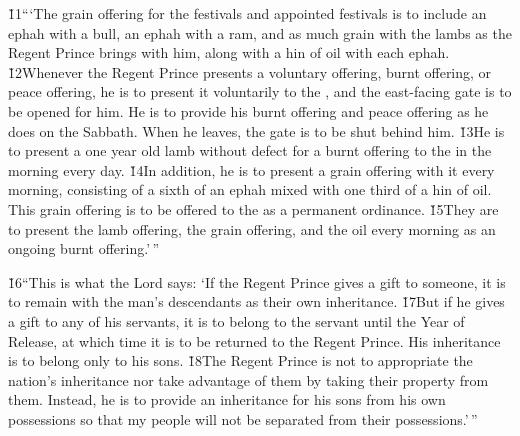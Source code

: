 \v{11}```The grain offering for the festivals and appointed festivals is to include an ephah with a bull, an ephah with a ram, and as much grain with the lambs as the Regent Prince brings with him, along with a hin of oil with each ephah. \v{12}Whenever the Regent Prince presents a voluntary offering, burnt offering, or peace offering, he is to present it voluntarily to the , and the east-facing gate is to be opened for him. He is to provide his burnt offering and peace offering as he does on the Sabbath. When he leaves, the gate is to be shut behind him. \v{13}He is to present a one year old lamb without defect for a burnt offering to the  in the morning every day. \v{14}In addition, he is to present a grain offering with it every morning, consisting of a sixth of an ephah mixed with one third of a hin of oil. This grain offering is to be offered to the  as a permanent ordinance. \v{15}They are to present the lamb offering, the grain offering, and the oil every morning as an ongoing burnt offering.'\,''

\v{16}``This is what the Lord  says: `If the Regent Prince gives a gift to someone, it is to remain with the man's descendants as their own inheritance. \v{17}But if he gives a gift to any of his servants, it is to belong to the servant until the Year of Release, at which time it is to be returned to the Regent Prince. His inheritance is to belong only to his sons. \v{18}The Regent Prince is not to appropriate the nation's inheritance nor take advantage of them by taking their property from them. Instead, he is to provide an inheritance for his sons from his own possessions so that my people will not be separated from their possessions.'\,''

